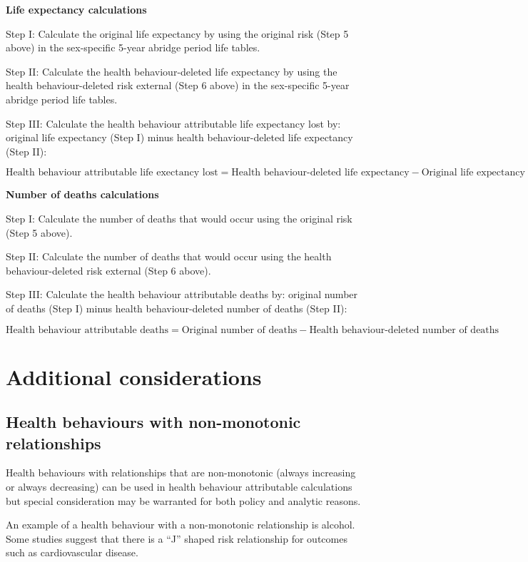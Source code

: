 \documentclass[]{book}
\begin{document}
\textbf{Life expectancy calculations}

Step I: Calculate the original life expectancy by using the original
risk (Step 5 above) in the sex-specific 5-year abridge period life
tables.

Step II: Calculate the health behaviour-deleted life expectancy by using
the health behaviour-deleted risk external (Step 6 above) in the
sex-specific 5-year abridge period life tables.

Step III: Calculate the health behaviour attributable life expectancy
lost by: original life expectancy (Step I) minus health
behaviour-deleted life expectancy (Step II):

\[ \text{Health behaviour attributable life exectancy lost} = \text{Health behaviour-deleted life expectancy} - \text{Original life expectancy}\]

\textbf{Number of deaths calculations}

Step I: Calculate the number of deaths that would occur using the
original risk (Step 5 above).

Step II: Calculate the number of deaths that would occur using the
health behaviour-deleted risk external (Step 6 above).

Step III: Calculate the health behaviour attributable deaths by:
original number of deaths (Step I) minus health behaviour-deleted number
of deaths (Step II):

\[\text{Health behaviour attributable deaths} = \text{Original number of deaths} - \text{Health behaviour-deleted number of deaths}\]

\section{Additional considerations}\label{additional-considerations}

\subsection{Health behaviours with non-monotonic
relationships}\label{health-behaviours-with-non-monotonic-relationships}

Health behaviours with relationships that are non-monotonic (always
increasing or always decreasing) can be used in health behaviour
attributable calculations but special consideration may be warranted for
both policy and analytic reasons.

An example of a health behaviour with a non-monotonic relationship is
alcohol. Some studies suggest that there is a ``J'' shaped risk
relationship for outcomes such as cardiovascular disease.
\end{document}
